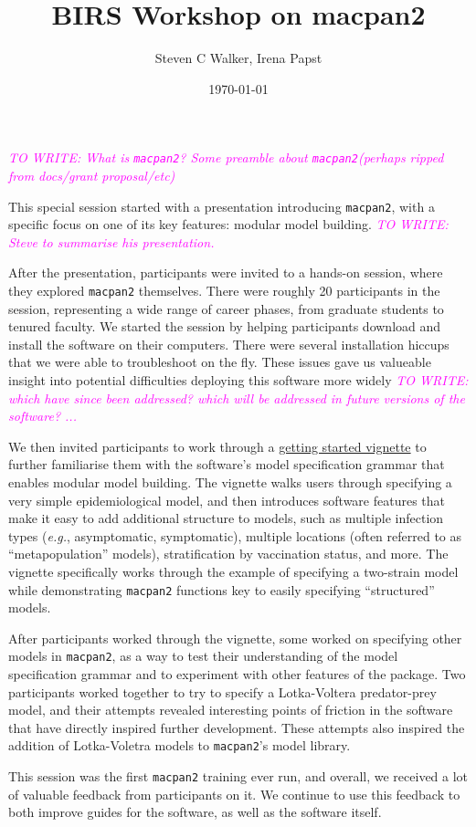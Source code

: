 \documentclass{article}
\title{BIRS Workshop on macpan2}
\date{\today}
\author{Steven C Walker, Irena Papst}
\newcommand{\towrite}[1]{\textcolor{magenta}{\textsl{TO WRITE: #1}}}
\newcommand{\macpan}{\texttt{macpan2}\xspace}
\newcommand{\eg}{\textit{e.g.},\xspace}
\begin{document}
  \maketitle

  \towrite{What is \macpan? Some preamble about \macpan (perhaps ripped from docs/grant proposal/etc)}

  This special session started with a presentation introducing \macpan, with a specific focus on one of its key features: modular model building. \towrite{Steve to summarise his presentation.}
  
  After the presentation, participants were invited to a hands-on session, where they explored \macpan themselves. There were roughly 20 participants in the session, representing a wide range of career phases, from graduate students to tenured faculty. We started the session by helping participants download and install the software on their computers. There were several installation hiccups that we were able to troubleshoot on the fly. These issues gave us valueable insight into potential difficulties deploying this software more widely \towrite{which have since been addressed? which will be addressed in future versions of the software? ...} 
  
  We then invited participants to work through a \href{https://github.com/canmod/macpan2/blob/refactorcpp/vignettes/quickstart.Rmd}{getting started vignette} to further familiarise them with the software's model specification grammar that enables modular model building. The vignette walks users through specifying a very simple epidemiological model, and then introduces software features that make it easy to add additional structure to models, such as multiple infection types (\eg asymptomatic, symptomatic), multiple locations (often referred to as ``metapopulation'' models), stratification by vaccination status, and more. The vignette specifically works through the example of specifying a two-strain model while demonstrating \macpan functions key to easily specifying ``structured'' models. 
  
  After participants worked through the vignette, some worked on specifying other models in \macpan, as a way to test their understanding of the model specification grammar and to experiment with other features of the package. Two participants worked together to try to specify a Lotka-Voltera predator-prey model, and their attempts revealed interesting points of friction in the software that have directly inspired further development. These attempts also inspired the addition of Lotka-Voletra models to \macpan's model library.

  This session was the first \macpan training ever run, and overall, we received a lot of valuable feedback from participants on it. We continue to use this feedback to both improve guides for the software, as well as the software itself. 
  
\end{document}
